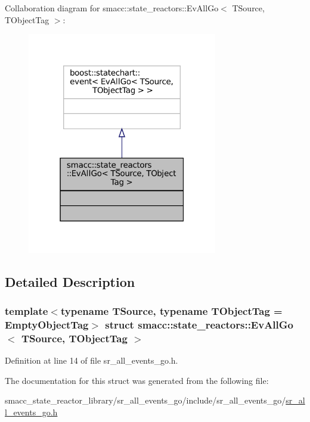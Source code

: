 Collaboration diagram for smacc\+:\+:state\+\_\+reactors\+:\+:Ev\+All\+Go$<$ T\+Source, T\+Object\+Tag $>$\+:
\nopagebreak
\begin{figure}[H]
\begin{center}
\leavevmode
\includegraphics[width=235pt]{structsmacc_1_1state__reactors_1_1EvAllGo__coll__graph}
\end{center}
\end{figure}


\subsection{Detailed Description}
\subsubsection*{template$<$typename T\+Source, typename T\+Object\+Tag = Empty\+Object\+Tag$>$\newline
struct smacc\+::state\+\_\+reactors\+::\+Ev\+All\+Go$<$ T\+Source, T\+Object\+Tag $>$}



Definition at line 14 of file sr\+\_\+all\+\_\+events\+\_\+go.\+h.



The documentation for this struct was generated from the following file\+:\begin{DoxyCompactItemize}
\item 
smacc\+\_\+state\+\_\+reactor\+\_\+library/sr\+\_\+all\+\_\+events\+\_\+go/include/sr\+\_\+all\+\_\+events\+\_\+go/\hyperlink{sr__all__events__go_8h}{sr\+\_\+all\+\_\+events\+\_\+go.\+h}\end{DoxyCompactItemize}

